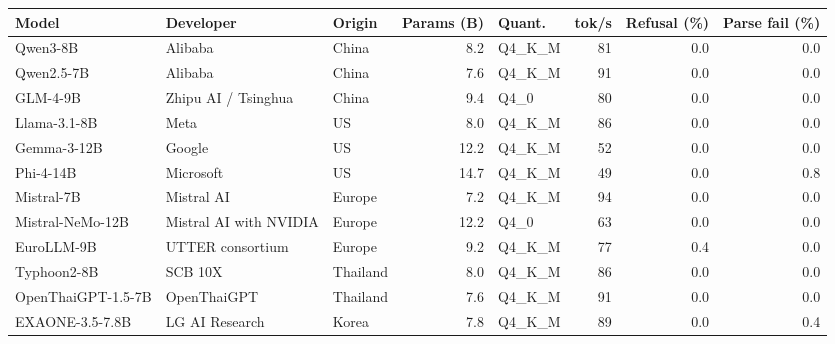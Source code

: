 \begin{tabular}{@{}lllrlrrr@{}}
\toprule
Model & Developer & Origin & Params (B) & Quant. & tok/s & Refusal (\%) & Parse fail (\%) \\
\midrule
Qwen3-8B & Alibaba & China & 8.2 & Q4\_K\_M & 81 & 0.0 & 0.0 \\
Qwen2.5-7B & Alibaba & China & 7.6 & Q4\_K\_M & 91 & 0.0 & 0.0 \\
GLM-4-9B & Zhipu AI / Tsinghua & China & 9.4 & Q4\_0 & 80 & 0.0 & 0.0 \\
Llama-3.1-8B & Meta & US & 8.0 & Q4\_K\_M & 86 & 0.0 & 0.0 \\
Gemma-3-12B & Google & US & 12.2 & Q4\_K\_M & 52 & 0.0 & 0.0 \\
Phi-4-14B & Microsoft & US & 14.7 & Q4\_K\_M & 49 & 0.0 & 0.8 \\
Mistral-7B & Mistral AI & Europe & 7.2 & Q4\_K\_M & 94 & 0.0 & 0.0 \\
Mistral-NeMo-12B & Mistral AI with NVIDIA & Europe & 12.2 & Q4\_0 & 63 & 0.0 & 0.0 \\
EuroLLM-9B & UTTER consortium & Europe & 9.2 & Q4\_K\_M & 77 & 0.4 & 0.0 \\
Typhoon2-8B & SCB 10X & Thailand & 8.0 & Q4\_K\_M & 86 & 0.0 & 0.0 \\
OpenThaiGPT-1.5-7B & OpenThaiGPT & Thailand & 7.6 & Q4\_K\_M & 91 & 0.0 & 0.0 \\
EXAONE-3.5-7.8B & LG AI Research & Korea & 7.8 & Q4\_K\_M & 89 & 0.0 & 0.4 \\
\bottomrule
\end{tabular}
